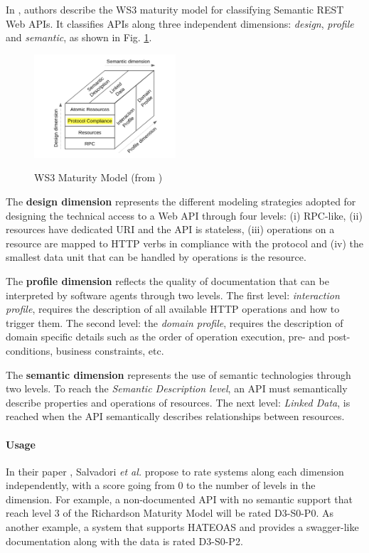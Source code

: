 In \cite{7195633}, authors describe the WS3 maturity model for classifying Semantic REST Web APIs. 
It classifies APIs along three independent dimensions: \textit{design}, \textit{profile} and \textit{semantic}, as shown in Fig. \ref{WS3}.

\begin{figure}[ht]
  \caption{WS3 Maturity Model (from \cite{7195633})}
  \centering
  \includegraphics[width=0.47\textwidth]{figures/ws3-maturity-model.png}
  \label{WS3}
\end{figure}

The \textbf{design dimension} represents the different modeling strategies adopted for designing the technical access to a Web API through four levels:
(i) RPC-like, (ii) resources have dedicated URI and the API is stateless, (iii) operations on a resource are mapped to HTTP verbs in compliance with the protocol and (iv) the smallest data unit that can be handled by operations is the resource.

The \textbf{profile dimension} reflects the quality of documentation that can be interpreted by software agents through two levels. The first level: \textit{interaction profile}, requires the description of all available HTTP operations and how to trigger them. The second level: the \textit{domain profile}, requires the description of domain specific details such as the order of operation execution, pre- and post-conditions, business constraints, etc.

The \textbf{semantic dimension} represents the use of semantic technologies through two levels. To reach the \textit{Semantic Description level}, an API must semantically describe properties and operations of resources. The next level: \textit{Linked Data}, is reached when the API semantically describes relationships between resources.

\paragraph{Usage}
In their paper \cite{7195633}, Salvadori \emph{et al.} propose to rate systems along each dimension independently, with a score going from 0 to the number of levels in the dimension.
For example, a non-documented API with no semantic support that reach level 3 of the Richardson Maturity Model will be rated D3-S0-P0. As another example, a system that supports HATEOAS and provides a swagger-like documentation along with the data is rated D3-S0-P2.

